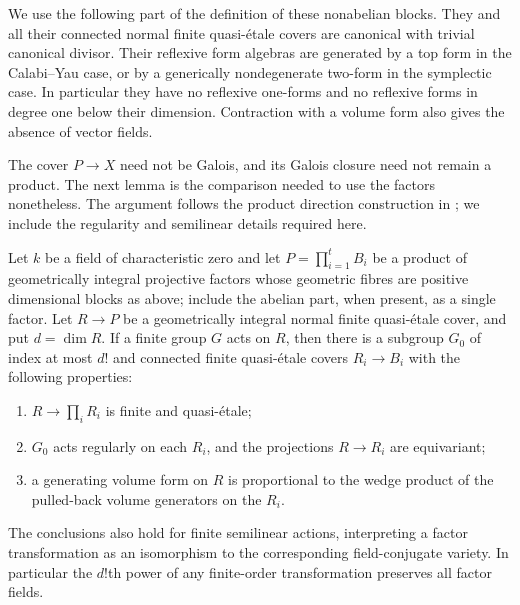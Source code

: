We use the following part of the definition of these nonabelian
blocks. They and all their connected normal finite quasi-\'etale
covers are canonical with trivial canonical divisor. Their
reflexive form algebras are generated by a top form in the
Calabi--Yau case, or by a generically nondegenerate two-form in
the symplectic case. In particular they have no reflexive
one-forms and no reflexive forms in degree one below their
dimension. Contraction with a volume form also gives the absence
of vector fields.

The cover $P\to X$ need not be Galois, and its Galois closure
need not remain a product. The next lemma is the comparison needed
to use the factors nonetheless. The argument follows the product
direction construction in \cite[Section~4.1]{U4}; we include the
regularity and semilinear details required here.

\begin{lemma}\label{lem:cover-comparison}
Let $k$ be a field of characteristic zero and let
$P=\prod_{i=1}^t B_i$ be a product of geometrically integral
projective factors whose geometric fibres are positive dimensional
blocks as above; include the abelian part, when present, as a single
factor. Let $R\to P$ be a geometrically integral normal finite
quasi-\'etale cover, and put $d=\dim R$. If a finite group $G$ acts
on $R$, then
there is a subgroup $G_0$ of index at most $d!$ and connected
finite quasi-\'etale covers $R_i\to B_i$ with the following
properties:
\begin{enumerate}
\item $R\to\prod_iR_i$ is finite and quasi-\'etale;
\item $G_0$ acts regularly on each $R_i$, and the projections
      $R\to R_i$ are equivariant;
\item a generating volume form on $R$ is proportional to the
      wedge product of the pulled-back volume generators on the $R_i$.
\end{enumerate}
The conclusions also hold for finite semilinear actions, interpreting
a factor transformation as an isomorphism to the corresponding
field-conjugate variety. In particular the $d!$th power of any
finite-order transformation preserves all factor fields.
\end{lemma}

